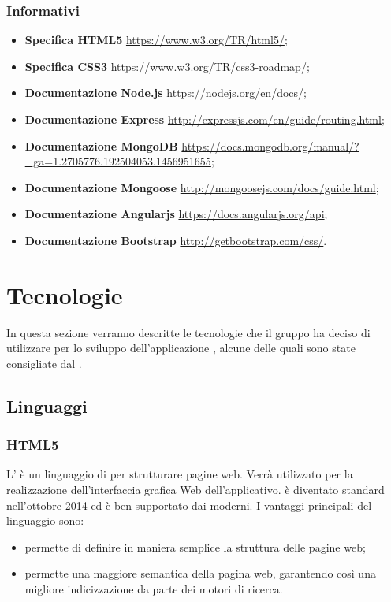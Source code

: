 \documentclass[12pt,a4paper]{article}
\begin{document}
\subsubsection{Informativi}
\begin{itemize}
    \item \textbf{Specifica HTML5} \url{https://www.w3.org/TR/html5/};
    \item \textbf{Specifica CSS3} \url{https://www.w3.org/TR/css3-roadmap/};
    \item \textbf{Documentazione Node.js} \url{https://nodejs.org/en/docs/};
    \item \textbf{Documentazione Express} \url{http://expressjs.com/en/guide/routing.html};
    \item \textbf{Documentazione MongoDB} \url{https://docs.mongodb.org/manual/?_ga=1.2705776.192504053.1456951655};
    \item \textbf{Documentazione Mongoose} \url{http://mongoosejs.com/docs/guide.html};
    \item \textbf{Documentazione Angularjs} \url{https://docs.angularjs.org/api};
    \item \textbf{Documentazione Bootstrap} \url{http://getbootstrap.com/css/}.
\end{itemize}

\newpage

\section{Tecnologie}\label{tecnologie}
In questa sezione verranno descritte le tecnologie che il gruppo ha deciso di utilizzare per lo sviluppo dell'applicazione \prjL{}, alcune delle quali sono state consigliate dal .

\subsection{Linguaggi}
\subsubsection{HTML5}\label{html}
L’ è un linguaggio di  per strutturare pagine web. Verrà utilizzato per la realizzazione dell’interfaccia grafica Web dell’applicativo.  è diventato standard  nell’ottobre 2014 ed è ben supportato dai  moderni. I vantaggi principali del linguaggio sono:

\begin{itemize}
	\item permette di definire in maniera semplice la struttura delle pagine web;
	\item permette una maggiore semantica della pagina web, garantendo così una migliore indicizzazione da parte dei motori di ricerca.
\end{itemize}
\end{document}
